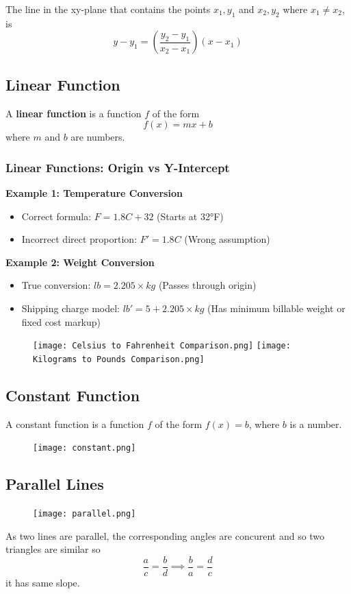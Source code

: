 The line in the xy-plane that contains the points \(x_{1},y_{1}\) and \(x_{2}, y_{2}\) where \(x_{1} \neq x_{2}\), is
\[y-y_{1} = \left( \frac{y_{2} - y_{1}}{x_{2} - x_{1}} \right) (x-x_{1})\]

\subsection{Linear Function}
A \textbf{linear function} is a function \(f\) of the form
\[f(x) = mx + b\]
where \(m\) and \(b\) are numbers.

\subsubsection{Linear Functions: Origin vs Y-Intercept}
\textbf{Example 1: Temperature Conversion}
\begin{itemize}
    \item Correct formula: \( F = 1.8C + 32 \) (Starts at 32°F)
    \item Incorrect direct proportion: \( F' = 1.8C \) (Wrong assumption)
\end{itemize}
\textbf{Example 2: Weight Conversion}
\begin{itemize}
    \item True conversion: \( lb = 2.205 \times kg \) (Passes through origin)
    \item Shipping charge model: \( lb' = 5 + 2.205 \times kg \) (Has minimum billable weight or fixed cost markup)
\end{itemize}
\begin{figure}
\centering
\texttt{[image: Celsius to Fahrenheit Comparison.png]}
\texttt{[image: Kilograms to Pounds Comparison.png]}
\end{figure}

\subsection{Constant Function}
A constant function is a function \(f\) of the form \(f (x) = b\),  where \(b\) is a number.
\begin{figure}
\centering
\texttt{[image: constant.png]}
\end{figure}

\subsection{Parallel Lines}
\begin{figure}
  \centering
  \texttt{[image: parallel.png]}
\end{figure}
As two lines are parallel, the corresponding angles are concurent and so two triangles are similar so
\[\frac{a}{c} = \frac{b}{d} \implies \frac{b}{a} = \frac{d}{c}  \]
it has same slope.

